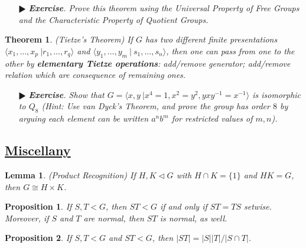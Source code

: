 \documentclass[11pt]{amsart}
\newtheorem*{theorem*}{Theorem}
\newtheorem*{lemma*}{Lemma}
\newtheorem*{proposition*}{Proposition}
\theoremstyle{definition}
\renewcommand\:{\colon}
\newcommand{\1}{\mathds{1}}
\newcommand{\exc}[1]{\vspace{-2.5pt}\begin{itemize}[leftmargin=15pt]\item[$\RHD$] \textit{\textbf{Exercise}. #1}\end{itemize}}
\begin{document}
\begin{center}
\end{center}

\exc{Prove this theorem using the Universal Property of Free Groups and the Characteristic Property of Quotient Groups.}

\begin{theorem*}
	\textnormal{(Tietze's Theorem)} If $G$ has two different finite presentations $\langle x_1, \dots, x_p \ | r_1, \dots, r_q \rangle$ and $\langle y_1, \dots, y_m \ | \ s_1, \dots, s_n \rangle$, then one can pass from one to the other by \textbf{elementary Tietze operations}: add/remove generator; add/remove relation which are consequence of remaining ones.
\end{theorem*}

\exc{Show that  $G = \langle x, y \ | x^4 = 1, x^2 = y^2, yxy^{-1} = x^{-1} \rangle$ is isomorphic to $Q_8$ (Hint: Use van Dyck's Theorem, and prove the group has order $8$ by arguing each element can be written $a^nb^m$ for restricted values of $m, n$).}

\vskip20pt




\subsection*{\underline{Miscellany}}

\begin{lemma*}
	\textnormal{(Product Recognition)} If $H, K \triangleleft G$ with $H \cap K = \{1\}$ and $HK = G$, then $G \cong H \times K$.
\end{lemma*}

\begin{proposition*}
	If $S, T < G$, then $ST < G$ if and only if $ST = TS$ setwise. Moreover, if $S$ and $T$ are normal, then $ST$ is normal, as well.
\end{proposition*}

\begin{proposition*}
	If $S, T < G$ and $ST < G$, then $\displaystyle |ST| = |S||T|/|S \cap T|$.
\end{proposition*}


\clearpage
\end{document}
